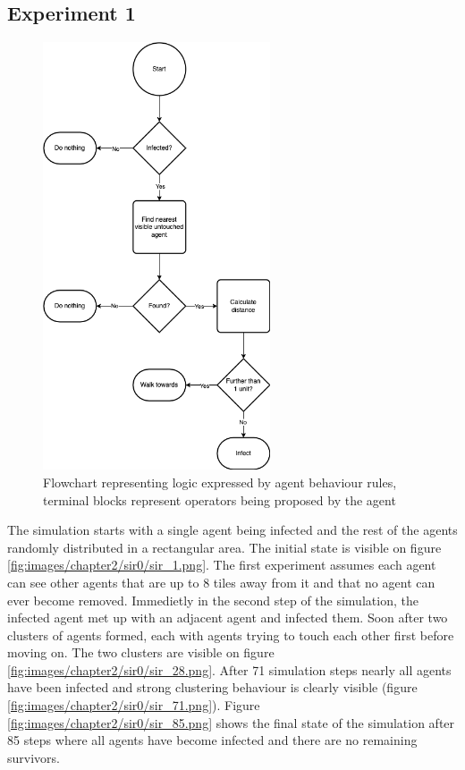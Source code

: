 \subsection{Experiment 1}

\begin{figure}[h]
    \centering
    \includegraphics[width=0.6\textwidth]{images/chapter2/sir_logic.drawio.png}
    \caption{Flowchart representing logic expressed by agent behaviour rules, terminal blocks represent operators being proposed by the agent}\label{fig:sir_logic.drawio.png}
\end{figure}

The simulation starts with a single agent being infected and the rest of the agents randomly distributed in a rectangular area.
The initial state is visible on figure \ref{fig:images/chapter2/sir0/sir_1.png}.
The first experiment assumes each agent can see other agents that are up to 8 tiles away from it and that no agent can ever become removed.
Immedietly in the second step of the simulation, the infected agent met up with an adjacent agent and infected them.
Soon after two clusters of agents formed, each with agents trying to touch each other first before moving on.
The two clusters are visible on figure \ref{fig:images/chapter2/sir0/sir_28.png}.
After 71 simulation steps nearly all agents have been infected and strong clustering behaviour is clearly visible (figure \ref{fig:images/chapter2/sir0/sir_71.png}).
Figure \ref{fig:images/chapter2/sir0/sir_85.png} shows the final state of the simulation after 85 steps where all agents have become infected and there are no remaining survivors.

